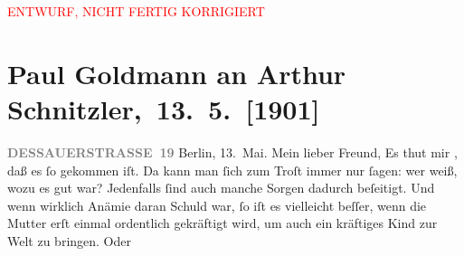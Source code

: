 
\begin{center}
            \textcolor{red}{ENTWURF, NICHT FERTIG KORRIGIERT}
                      \end{center}
            
         
         \renewcommand{\erwaehntePersonen}{Personen: Robert Hirschfeld, Karl Felix Kohler, Olga Schnitzler, Heinrich Schnitzler, Louise Schnitzler}
         \renewcommand{\erwaehnteInstitutionen}{Institutionen: Neue Freie Presse}
         \renewcommand{\erwaehnteOrte}{Orte: Berlin, Dessauer Straße, Klosters Dorf, Pörtschach, Schweiz, Velden am Wörthersee, Wien, Wörthersee}
         \renewcommand{\erwaehnteWerke}{}
               \section[ Paul Goldmann an Arthur Schnitzler, 13. 5. {[}1901{]}]{ Paul Goldmann an Arthur Schnitzler, 13. 5. {[}1901{]}}\nopagebreak{}\rehead{ }\begin{ledgroupsized}[t]{13cm}\normalsize\beginnumbering \toendnotes[C]{\smallbreak\pagebreak[2]} 
\toendnotes[C]{\smallbreak}\pstart
           \noindent{}\raggedleft{}{\pb}\textcolor{gray}{\textbf{DESSAUERSTRASSE 19}}\pend
           \pstart
           Berlin, 13. Mai.\pend
           \pstart\center{}Mein lieber Freund,\pend\pstart
           Es thut mir \label{K_L03066-1v}\label{K_L03066-1h}, daß es ſo gekommen
               iſt. Da kann man ſich zum Troſt immer nur ſagen: wer weiß, wozu es gut war?
               Jedenfalls ſind auch manche Sorgen dadurch beſeitigt. Und wenn wirklich Anämie daran
               Schuld war, ſo iſt es vielleicht beſſer, wenn die Mutter erſt einmal ordentlich gekräftigt wird, um {\pb}auch ein kräftiges Kind zur Welt zu bringen. Oder

\end{ledgroupsized}
